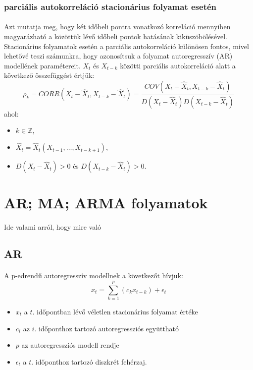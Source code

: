 \documentclass[11pt,a4pape,draftr]{article}
\begin{document}
					\subsubsection{parciális autokorreláció stacionárius folyamat esetén}
						\paragraph{}
							Azt mutatja meg, hogy két időbeli pontra vonatkozó korreláció mennyiben magyarázható a közöttük lévő időbeli pontok hatásának kiküszöbölésével. Stacionárius folyamatok esetén a parciális autokorreláció különösen fontos, mivel lehetővé teszi számunkra, hogy azonosítsuk a folyamat autoregresszív (AR) modellének paramétereit.
							$X_t$ és $X_{t-k}$ közötti parciális autokorreláció alatt a következő összefüggést értjük:
							\[
							\rho_k = CORR(X_t - \widehat{X}_t, X_{t-k} - \widehat{X}_{t}) = \frac{COV(X_t - \widehat{X}_t, X_{t-k} - \widehat{X}_{t})}{D(X_t - \widehat{X}_t)D(X_{t-k} - \widehat{X}_{t})}
							\]
							ahol:
							\begin{itemize}
								\item $k \in \mathbb{Z}$,
								\item $\widehat{X}_t = \widehat{X}_t(X_{t-1}, \dots, X_{t-k+1})$,
								\item $D(X_t - \hat{X}_t) > 0$ és $D(X_{t-k} - \hat{X}_t) > 0$.
							\end{itemize}
			
			\section{AR; MA; ARMA folyamatok}
				\paragraph{}
					Ide valami arról, hogy mire való
				\subsection{AR}
					\paragraph{}
						A p-edrendű autoregresszív modellnek a következőt hívjuk:
						$$x_t = \sum_{k=1}^{p}(c_k x_{t-k}) + \epsilon_t$$
						\begin{itemize}
							\item $x_t$ a $t.$ időpontban lévő véletlen stacionárius folyamat értéke
							\item $c_i$ az $i.$ időponthoz tartozó autoregressziós együttható
							\item $p$ az autoregressziós modell rendje
							\item $\epsilon_t$ a $t.$ időponthoz tartozó diszkrét fehérzaj.
						\end{itemize}
\end{document}
